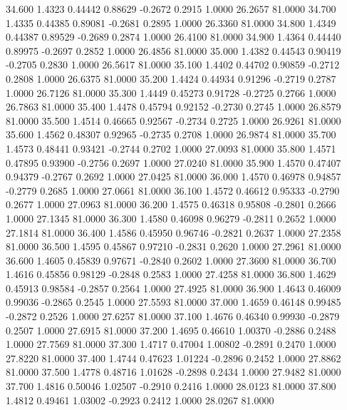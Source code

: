   34.600   1.4323   0.44442   0.88629  -0.2672   0.2915   1.0000  26.2657  81.0000
  34.700   1.4335   0.44385   0.89081  -0.2681   0.2895   1.0000  26.3360  81.0000
  34.800   1.4349   0.44387   0.89529  -0.2689   0.2874   1.0000  26.4100  81.0000
  34.900   1.4364   0.44440   0.89975  -0.2697   0.2852   1.0000  26.4856  81.0000
  35.000   1.4382   0.44543   0.90419  -0.2705   0.2830   1.0000  26.5617  81.0000
  35.100   1.4402   0.44702   0.90859  -0.2712   0.2808   1.0000  26.6375  81.0000
  35.200   1.4424   0.44934   0.91296  -0.2719   0.2787   1.0000  26.7126  81.0000
  35.300   1.4449   0.45273   0.91728  -0.2725   0.2766   1.0000  26.7863  81.0000
  35.400   1.4478   0.45794   0.92152  -0.2730   0.2745   1.0000  26.8579  81.0000
  35.500   1.4514   0.46665   0.92567  -0.2734   0.2725   1.0000  26.9261  81.0000
  35.600   1.4562   0.48307   0.92965  -0.2735   0.2708   1.0000  26.9874  81.0000
  35.700   1.4573   0.48441   0.93421  -0.2744   0.2702   1.0000  27.0093  81.0000
  35.800   1.4571   0.47895   0.93900  -0.2756   0.2697   1.0000  27.0240  81.0000
  35.900   1.4570   0.47407   0.94379  -0.2767   0.2692   1.0000  27.0425  81.0000
  36.000   1.4570   0.46978   0.94857  -0.2779   0.2685   1.0000  27.0661  81.0000
  36.100   1.4572   0.46612   0.95333  -0.2790   0.2677   1.0000  27.0963  81.0000
  36.200   1.4575   0.46318   0.95808  -0.2801   0.2666   1.0000  27.1345  81.0000
  36.300   1.4580   0.46098   0.96279  -0.2811   0.2652   1.0000  27.1814  81.0000
  36.400   1.4586   0.45950   0.96746  -0.2821   0.2637   1.0000  27.2358  81.0000
  36.500   1.4595   0.45867   0.97210  -0.2831   0.2620   1.0000  27.2961  81.0000
  36.600   1.4605   0.45839   0.97671  -0.2840   0.2602   1.0000  27.3600  81.0000
  36.700   1.4616   0.45856   0.98129  -0.2848   0.2583   1.0000  27.4258  81.0000
  36.800   1.4629   0.45913   0.98584  -0.2857   0.2564   1.0000  27.4925  81.0000
  36.900   1.4643   0.46009   0.99036  -0.2865   0.2545   1.0000  27.5593  81.0000
  37.000   1.4659   0.46148   0.99485  -0.2872   0.2526   1.0000  27.6257  81.0000
  37.100   1.4676   0.46340   0.99930  -0.2879   0.2507   1.0000  27.6915  81.0000
  37.200   1.4695   0.46610   1.00370  -0.2886   0.2488   1.0000  27.7569  81.0000
  37.300   1.4717   0.47004   1.00802  -0.2891   0.2470   1.0000  27.8220  81.0000
  37.400   1.4744   0.47623   1.01224  -0.2896   0.2452   1.0000  27.8862  81.0000
  37.500   1.4778   0.48716   1.01628  -0.2898   0.2434   1.0000  27.9482  81.0000
  37.700   1.4816   0.50046   1.02507  -0.2910   0.2416   1.0000  28.0123  81.0000
  37.800   1.4812   0.49461   1.03002  -0.2923   0.2412   1.0000  28.0267  81.0000
